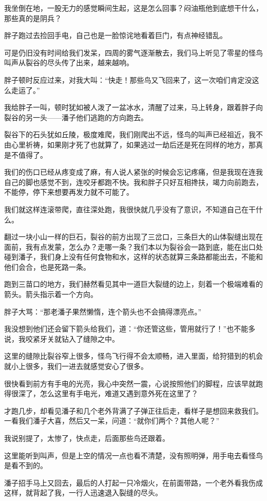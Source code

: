 我坐倒在地，一股无力的感觉瞬间生起，这是怎么回事？闷油瓶他到底想干什么，那些真的是阴兵？

胖子跑过去捡回手电，自己也是一脸惊诧地看着巨门，有点神经错乱。

可是仍旧没有时间给我们发呆，四周的雾气逐渐散去，我们马上听见了零星的怪鸟叫声从裂谷的尽头传了出来，越来越响。

胖子顿时反应过来，对我大叫：“快走！那些鸟又飞回来了，这一次咱们肯定没这么走运了。”

我给胖子一叫，顿时犹如被人泼了一盆冰水，清醒了过来，马上转身，跟着胖子向裂谷的另一头——潘子他们逃跑的方向跑去。

裂谷下的石头犹如丘陵，极度难爬，我们刚爬出不远，怪鸟的叫声已经祖近，我不由心里祈祷，如果刚才死了也就算了，如果逃过一劫后还是死在同样的地方，那真是不值得了。

我们的伤口已经从疼变成了麻，有人说人紧张的时候会忘记疼痛，但是我现在连我自己的脚也感觉不到，连咬牙都跑不快。我和胖子只好互相搀扶，竭力向前跑去，不能停，停下来想要再发力就不可能了。

我们就这样连滚带爬，直往深处跑，我很快就几乎没有了意识，不知道自己在干什么。

翻过一块小山一样的巨石，裂谷的前方出现了三岔口，三条巨大的山体裂缝出现在面前，我有点发蒙，怎么办？走哪一条？我们本以为裂谷会一路到底，能在出口处碰到潘子，我们身上没有任何食物和水，这样的状态就算三条路都能出去，不能和他们会合，也是死路一条。

跑到三苗口的地方，我们赫然看见其中一道巨大裂缝的边上，刻着一个极端难看的箭头。箭头指示着一个方向。

胖子大骂：“那老潘子果然懒惰，连个箭头也不会搞得漂亮点。”

我没想到他们还会留下箭头给我们，道：“你还管这些，管用就行了！”也不能多说，我咬紧牙关就钻入了缝隙之中。

这里的缝隙比裂谷窄上很多，怪鸟飞行得不会太顺畅，进入里面，给狩猎到的机会就小上很多，我们一进去就感觉安心了很多。

很快看到前方有手电的光亮，我心中突然一震，心说按照他们的脚程，应该早就跑得很深了，怎么这里有手电光，难道又遇到意外死在这里了？

才跑几步，却看见潘子和几个老外背满了子弹正往后走，看样子是想回来救我们。一看我们潘子大喜，然后又一呆，问道：“就你们两个？其他人呢？”

我说别提了，太惨了，快点走，后面那些鸟还跟着。

这里能听到叫声，但是上空的情况一点也看不清楚，没有照明弹，用手电去看怪鸟是看不到的。

潘子招手马上又回去，最后的人打起一只冷烟火，在前面带路，一个老外看我伤成这样，就背起了我，一行人迅速退入裂缝的尽头。

